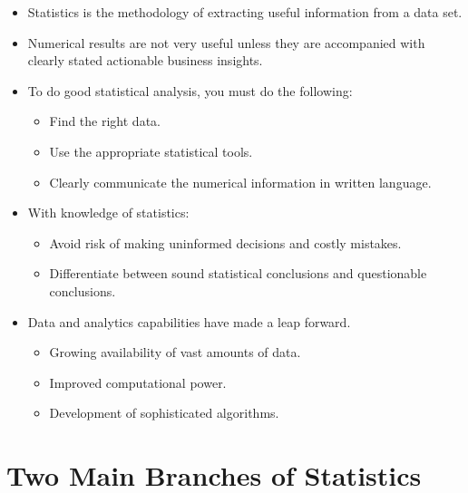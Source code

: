 \documentclass[
  letterpaper,
  DIV=11,
  numbers=noendperiod]{scrreprt}
\providecommand{\tightlist}{%
  \setlength{\itemsep}{0pt}\setlength{\parskip}{0pt}}\usepackage{longtable,booktabs,array}
\begin{document}
\begin{itemize}
\tightlist
\item
  Statistics is the methodology of extracting useful information from a
  data set.
\item
  Numerical results are not very useful unless they are accompanied with
  clearly stated actionable business insights.
\item
  To do good statistical analysis, you must do the following:

  \begin{itemize}
  \tightlist
  \item
    Find the right data.
  \item
    Use the appropriate statistical tools.
  \item
    Clearly communicate the numerical information in written language.
  \end{itemize}
\item
  With knowledge of statistics:

  \begin{itemize}
  \tightlist
  \item
    Avoid risk of making uninformed decisions and costly mistakes.
  \item
    Differentiate between sound statistical conclusions and questionable
    conclusions.
  \end{itemize}
\item
  Data and analytics capabilities have made a leap forward.

  \begin{itemize}
  \tightlist
  \item
    Growing availability of vast amounts of data.
  \item
    Improved computational power.
  \item
    Development of sophisticated algorithms.
  \end{itemize}
\end{itemize}

\section{Two Main Branches of
Statistics}\label{two-main-branches-of-statistics}
\end{document}
